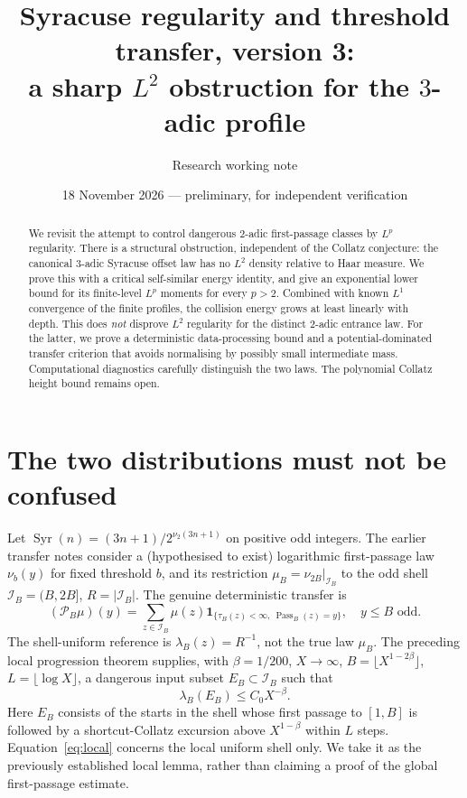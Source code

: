 \documentclass[10pt]{amsart}
\title[Regularity and an $L^2$ barrier]{Syracuse regularity and threshold transfer, version 3:\\ a sharp $L^2$ obstruction for the $3$-adic profile}
\author{Research working note}
\date{18 November 2026 --- preliminary, for independent verification}
\theoremstyle{definition}\newtheorem{definition}[theorem]{Definition}
\theoremstyle{remark}\newtheorem{remark}[theorem]{Remark}
\newcommand{\Syr}{\operatorname{Syr}}
\newcommand{\Pass}{\operatorname{Pass}}
\newcommand{\one}{\mathbf1}
\newcommand{\cP}{\mathcal P}
\newcommand{\cI}{\mathcal I}
\begin{document}
\begin{abstract}
We revisit the attempt to control dangerous $2$-adic first-passage classes by $L^p$ regularity. There is a structural obstruction, independent of the Collatz conjecture: the canonical $3$-adic Syracuse offset law has no $L^2$ density relative to Haar measure. We prove this with a critical self-similar energy identity, and give an exponential lower bound for its finite-level $L^p$ moments for every $p>2$. Combined with known $L^1$ convergence of the finite profiles, the collision energy grows at least linearly with depth. This does \emph{not} disprove $L^2$ regularity for the distinct $2$-adic entrance law. For the latter, we prove a deterministic data-processing bound and a potential-dominated transfer criterion that avoids normalising by possibly small intermediate mass. Computational diagnostics carefully distinguish the two laws. The polynomial Collatz height bound remains open.
\end{abstract}
\maketitle

\section{The two distributions must not be confused}
Let $\Syr(n)=(3n+1)/2^{\nu_2(3n+1)}$ on positive odd integers. The earlier transfer notes consider a (hypothesised to exist) logarithmic first-passage law $\nu_b(y)$ for fixed threshold $b$, and its restriction $\mu_B=\nu_{2B}|_{\cI_B}$ to the odd shell $\cI_B=(B,2B]$, $R=|\cI_B|$. The genuine deterministic transfer is
\[
 (\cP_B\mu)(y)=\sum_{z\in\cI_B}\mu(z)\one_{\{\tau_B(z)<\infty,\ \Pass_B(z)=y\}},\quad y\le B\text{ odd}.
\]
The shell-uniform reference is $\lambda_B(z)=R^{-1}$, not the true law $\mu_B$. The preceding local progression theorem supplies, with $\beta=1/200$, $X\to\infty$, $B=\lfloor X^{1-2\beta}\rfloor$, $L=\lfloor\log X\rfloor$, a dangerous input subset $E_B\subset\cI_B$ such that
\begin{equation}\label{eq:local}
 \lambda_B(E_B)\le C_0X^{-\beta}.
\end{equation}
Here $E_B$ consists of the starts in the shell whose first passage to $[1,B]$ is followed by a shortcut-Collatz excursion above $X^{1-\beta}$ within $L$ steps. Equation~\eqref{eq:local} concerns the local uniform shell only. We take it as the previously established local lemma, rather than claiming a proof of the global first-passage estimate.
\end{document}
